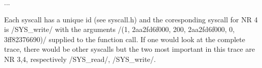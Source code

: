                                ...

\stoptyping

Each syscall has a unique id (see syscall.h) and the coresponding
syscall for NR 4 is /SYS_write/ with the arguments /(1, 2aa2fd6f000,
200, 2aa2fd6f000, 0, 3ff82376690)/ supplied to the function call.
If one would look at the complete trace, there would be other
syscalls but the two most important in this trace are NR 3,4,
respectively /SYS_read/, /SYS_write/.
